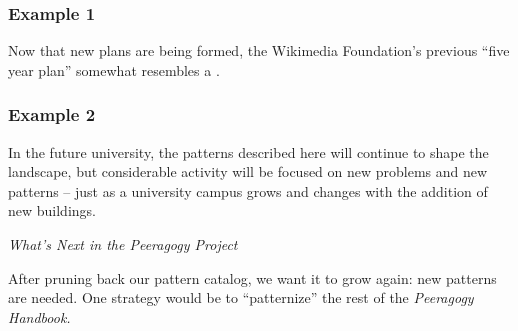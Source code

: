 \subsubsection*{Example 1} Now that new plans are being formed, the Wikimedia Foundation's previous ``five year plan'' somewhat
resembles a  \cite{wikimedia2011plan}.

\subsubsection*{Example 2} 
In the future university, the patterns described here will continue to
shape the landscape, but considerable activity will be focused on new
problems and new patterns -- just as a university campus grows and
changes with the addition of new buildings.

\begin{framed}
\noindent 
\emph{What's Next in the Peeragogy Project}
\begin{collectinmacro}{\ScrapbookWN}{}{}
After pruning back our pattern catalog, we want it to grow again: new patterns are needed.
One strategy would be to ``patternize'' the rest of the \emph{Peeragogy Handbook.}
\end{collectinmacro}
\ScrapbookWN
\end{framed}


